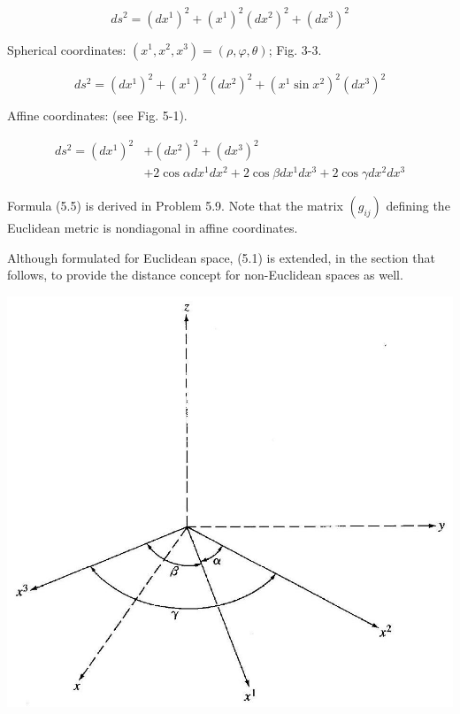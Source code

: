 \documentclass[10pt]{article}
\begin{document}
\begin{equation*}
d s^{2}=\left(d x^{1}\right)^{2}+\left(x^{1}\right)^{2}\left(d x^{2}\right)^{2}+\left(d x^{3}\right)^{2} \tag{5.3}
\end{equation*}


Spherical coordinates: $\left(x^{1}, x^{2}, x^{3}\right)=(\rho, \varphi, \theta)$; Fig. 3-3.


\begin{equation*}
d s^{2}=\left(d x^{1}\right)^{2}+\left(x^{1}\right)^{2}\left(d x^{2}\right)^{2}+\left(x^{1} \sin x^{2}\right)^{2}\left(d x^{3}\right)^{2} \tag{5.4}
\end{equation*}


Affine coordinates: (see Fig. 5-1).


\begin{align*}
d s^{2}=\left(d x^{1}\right)^{2} & +\left(d x^{2}\right)^{2}+\left(d x^{3}\right)^{2} \\
& +2 \cos \alpha d x^{1} d x^{2}+2 \cos \beta d x^{1} d x^{3}+2 \cos \gamma d x^{2} d x^{3} \tag{5.5}
\end{align*}


Formula (5.5) is derived in Problem 5.9. Note that the matrix $\left(g_{i j}\right)$ defining the Euclidean metric is nondiagonal in affine coordinates.

Although formulated for Euclidean space, (5.1) is extended, in the section that follows, to provide the distance concept for non-Euclidean spaces as well.

\begin{center}
\includegraphics[max width=\textwidth]{2024_04_03_41f90be4f896e21f0dc9g-061}
\end{center}
\end{document}

